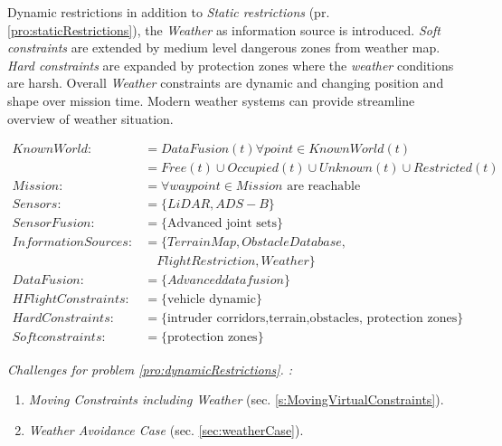 \begin{problem}{Dynamic restrictions}\label{pro:dynamicRestrictions}
    in addition to \emph{Static restrictions} (pr. \ref{pro:staticRestrictions}), the \emph{Weather} as information source is introduced. \emph{Soft constraints} are extended by medium level dangerous zones from weather map. \emph{Hard constraints} are expanded by protection zones where the \emph{weather} conditions are harsh. Overall \emph{Weather} constraints are dynamic and changing position and shape over mission time. Modern weather systems can provide streamline overview of weather situation. 
    
    \begin{equation}\label{eq:dynamicRestrictionsProblemDefinition}
        \begin{aligned}
            KnownWorld:&= DataFusion(t)\forall point\in KnownWorld(t)\\
                       &=Free(t) \cup Occupied(t) \cup Unknown(t) \cup Restricted(t)\\
            Mission:&= \forall waypoint\in Mission \text{ are reachable}\\
            Sensors:&= \{LiDAR,ADS-B\}\\
            SensorFusion:&= \{\text{Advanced joint sets}\}\\
            InformationSources:&=\{Terrain Map,Obstacle Database,\\
                               &\quad Flight Restriction,Weather\}\\
            DataFusion:&= \{Advanced data fusion\}\\
            HFlightConstraints:&=\{\text{vehicle dynamic}\}\\
            HardConstraints:&=\{\text{intruder corridors,terrain,obstacles, protection zones}\}\\
            Softconstraints:&=\{\text{protection zones}\}
        \end{aligned}
    \end{equation}
    
    \noindent \emph{Challenges for problem  \ref{pro:dynamicRestrictions}. :}
    \begin{enumerate}
        \item\emph{Moving Constraints including Weather} (sec. \ref{s:MovingVirtualConstraints}).
        \item\emph{Weather Avoidance Case} (sec. \ref{sec:weatherCase}).
    \end{enumerate}
\end{problem}

